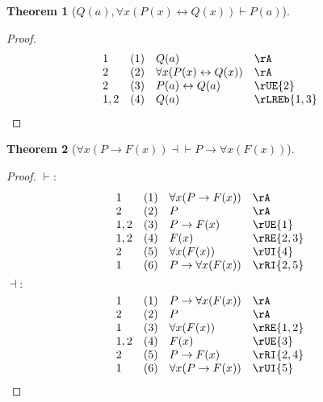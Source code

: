 \documentclass{book}
\theoremstyle{plain}
\newtheorem{theorem}{Theorem}
\theoremstyle{remark}
\theoremstyle{definition}
\begin{document}
\label{QLpaRpwFaxLpPLpxRpLrQLpxRpRpImpPLpaRp}
\begin{theorem}[\(Q(a), \forall x(P(x) \leftrightarrow Q(x)) \vdash P(a)\)]
\end{theorem}
\begin{proof}
	\[
	\begin{array}{llll}
		1 & (1) & Q(a) & \rA \\
		2 & (2) & \forall x(P(x) \leftrightarrow Q(x)) & \rA \\
		2 & (3) & P(a) \leftrightarrow Q(a) & \rUE{2} \\
		1,2 & (4) & Q(a) & \rLREb{1,3} \\
	\end{array}
	\]
\end{proof}

\label{FaxLpPToFLpxRpRpEqvPToFaxLpFLpxRpRp}
\begin{theorem}[\(\forall x(P \rightarrow F(x)) \dashv \vdash P \rightarrow \forall x(F(x))\)]
\end{theorem}
\begin{proof}
	\(\vdash:\)
	\[
	\begin{array}{llll}
		1 & (1) & \forall x(P \rightarrow F(x)) & \rA \\
		2 & (2) & P & \rA \\
		1,2 & (3) & P \rightarrow F(x) & \rUE{1} \\
		1,2 & (4) & F(x) & \rRE{2,3} \\
		2 & (5) & \forall x(F(x)) & \rUI{4} \\
		1 & (6) & P \rightarrow \forall x(F(x)) & \rRI{2,5} \\
	\end{array}
	\]
	\(\dashv:\)
	\[
	\begin{array}{llll}
		1 & (1) & P \rightarrow \forall x(F(x)) & \rA \\
		2 & (2) & P & \rA \\
		1 & (3) & \forall x(F(x)) & \rRE{1,2} \\
		1,2 & (4) & F(x) & \rUE{3} \\
		2 & (5) & P \rightarrow F(x) & \rRI{2,4} \\
		1 & (6) & \forall x(P \rightarrow F(x)) & \rUI{5} \\
	\end{array}
	\]
\end{proof}
\end{document}
